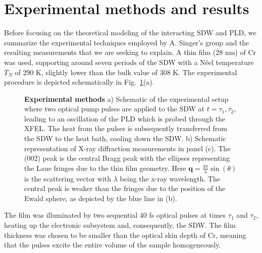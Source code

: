 \section{Experimental methods and results \label{sec:Cr_experiment}}
Before focusing on the theoretical modeling of the interacting \gls{SDW} and \gls{PLD}, we summarize the experimental techniques employed by A. Singer's group and the resulting measurements that we are seeking to explain.
A thin film (28 nm) of Cr was used, supporting around seven periods of the \gls{SDW} with a N\'eel temperature $T_N$ of 290 K, slightly lower than the bulk value of 308 K.
The experimental procedure is depicted schematically in Fig.~\ref{fig:Cr_schematic}(a). 
\begin{figure}[h]
\caption{\label{fig:Cr_schematic}{\bf Experimental methods} a) Schematic of the experimental setup where two optical pump pulses are applied to the \gls{SDW} at $t=\tau_1,\tau_2$, leading to an oscillation of the \gls{PLD} which is probed through the \gls{XFEL}. The heat from the pulses is subsequently transferred from the \gls{SDW} to the heat bath, cooling down the \gls{SDW}. b) Schematic representation of X-ray diffraction measurements in panel (c). The (002) peak is the central Bragg peak with the ellipses representing the Laue fringes due to the thin film geometry. Here $\bm q=\frac{4\pi}{\lambda} \sin(\theta)$ is the scattering vector with $\lambda$ being the x-ray wavelength. The central peak is weaker than the fringes due to the position of the Ewald sphere, as depicted by the blue line in (b).}
\end{figure}
The film was illuminated by two sequential 40 fs optical pulses at times $\tau_1$ and $\tau_2$, heating up the electronic subsystem and, consequently, the \gls{SDW}.
The film thickness was chosen to be smaller than the optical skin depth of Cr, meaning that the pulses excite the entire volume of the sample homogeneously.

